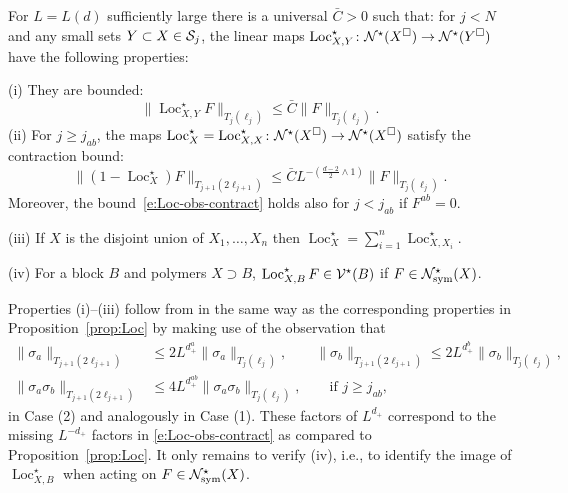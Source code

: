 \documentclass[11pt]{amsart}
\numberwithin{equation}{section}
\numberwithin{theorem}{section}
\newcommand{\1}{{\bf 1}}
\newcommand{\obs}{\star}
\newcommand{\dplus}{(\frac{d-2}{2} \wedge 1)}
\newcommand{\Loc}{\operatorname{Loc}}
\begin{document}
\begin{proposition} \label{prop:Loc-obs}
  For $L=L(d)$ sufficiently large there is a universal $\bar
  C>0$ such that: for $j<N$ and any small sets $Y \subset X \in \mathcal S_j$,
  the linear maps
  $\Loc_{X,Y}^\obs \colon \cN^\obs(X^\square) \to \cN^\obs(Y^\square)$ have the following properties:
  \smallskip
  
  \noindent
  (i) They are bounded:
  \begin{equation} \label{e:Loc-obs-bd}
    \|\Loc_{X,Y}^\obs F\|_{T_{j}(\ell_{j})} \leq \bar C \|F\|_{T_j(\ell_{j})}.
  \end{equation}
\smallskip
\noindent
  (ii) For $j\geq j_{ab}$, the maps $\Loc_X^{\obs} \bydef \Loc_{X,X}^{\obs}\colon \cN^{\obs}(X^\square) \to \cN^{\obs}(X^\square)$ satisfy the contraction bound:
  \begin{equation} \label{e:Loc-obs-contract}
    \|(1-\Loc_X^\obs)F\|_{T_{j+1}(2\ell_{j+1})} \leq \bar C L^{-\dplus} 
    \|F\|_{T_j(\ell_j)}.
  \end{equation}
  Moreover, the bound~\eqref{e:Loc-obs-contract} holds also for $j<j_{ab}$ if $F^{ab}=0$.

  \smallskip
  \noindent
%
  (iii) If $X$ is the disjoint union of $X_1, \dots, X_n$ then
  $\Loc_X^{\obs} = \sum_{i=1}^n \Loc_{X,X_i}^{\obs}$.

  \smallskip
  \noindent
  (iv) For a block $B$ and polymers $X \supset B$,
  $\Loc_{X,B}^\obs F \in \cV^\obs(B)$ if $F \in \cN^{\obs}_{\rm sym}(X)$.
\end{proposition}

Properties (i)--(iii) follow from \cite{MR3332939} in the same way as
the corresponding properties in Proposition~\ref{prop:Loc} by making use
of the observation that
\begin{align}
  \|\sigma_a\|_{T_{j+1}(2\ell_{j+1})}
  &\leq
    2L^{d_+^a}\|\sigma_a\|_{T_{j}(\ell_{j})},  \qquad  \|\sigma_b\|_{T_{j+1}(2\ell_{j+1})} \leq
    2L^{d_+^b}\|\sigma_b\|_{T_{j}(\ell_{j})}, \\
  \|\sigma_{a}\sigma_b\|_{T_{j+1}(2\ell_{j+1})}
  &\leq 4L^{d_+^{ab}}
    \|\sigma_{a}\sigma_b\|_{T_{j}(\ell_{j})}, \qquad \text{if $j\geq j_{ab}$},
\end{align}
in Case (2) and analogously in Case (1).  These factors of $L^{d_+}$
correspond to the missing $L^{-d_+}$ factors in \eqref{e:Loc-obs-contract} as compared to  Proposition~\ref{prop:Loc}.
%
It only remains to verify (iv), i.e., to identify the image of
$\Loc_{X,B}^\obs$ when acting on $F \in \cN^{\obs}_{\rm
  sym}(X)$.
\end{document}
